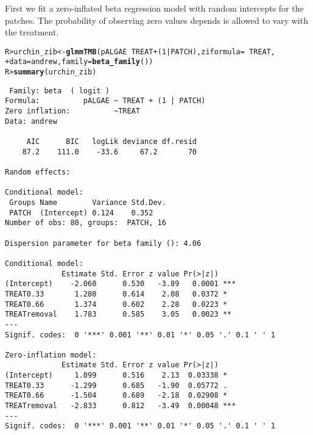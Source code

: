 \documentclass[11pt]{article}\usepackage[]{graphicx}\usepackage{xcolor}
\makeatletter
\newcommand{\hlnum}[1]{\textcolor[rgb]{0.686,0.059,0.569}{#1}}%
\newcommand{\hlopt}[1]{\textcolor[rgb]{0,0,0}{#1}}%
\newcommand{\hlstd}[1]{\textcolor[rgb]{0.345,0.345,0.345}{#1}}%
\newcommand{\hlkwb}[1]{\textcolor[rgb]{0.69,0.353,0.396}{#1}}%
\newcommand{\hlkwc}[1]{\textcolor[rgb]{0.333,0.667,0.333}{#1}}%
\newcommand{\hlkwd}[1]{\textcolor[rgb]{0.737,0.353,0.396}{\textbf{#1}}}%
\newenvironment{kframe}{%
 \def\at@end@of@kframe{}%
 \ifinner\ifhmode%
  \def\at@end@of@kframe{\end{minipage}}%
  \begin{minipage}{\columnwidth}%
 \fi\fi%
 \def\FrameCommand##1{\hskip\@totalleftmargin \hskip-\fboxsep
 \colorbox{shadecolor}{##1}\hskip-\fboxsep
     \hskip-\linewidth \hskip-\@totalleftmargin \hskip\columnwidth}%
 \MakeFramed {\advance\hsize-\width
   \@totalleftmargin\z@ \linewidth\hsize
   \@setminipage}}%
 {\par\unskip\endMakeFramed%
 \at@end@of@kframe}
\newenvironment{knitrout}{}{} %
\newcommand{\0}{{\mathbf{0}}}
\makeatother
\begin{document}
First we fit a zero-inflated beta regression model with random intercepts
for the patches. The probability of observing zero values depends is allowed to
vary with the treatment.
%
\begin{knitrout}\small
{}\color{fgcolor}\begin{kframe}
\begin{alltt}
\hlstd{R> }\hlstd{urchin_zib} \hlkwb{<-} \hlkwd{glmmTMB}\hlstd{(pALGAE} \hlopt{~} \hlstd{TREAT} \hlopt{+} \hlstd{(}\hlnum{1} \hlopt{|} \hlstd{PATCH),} \hlkwc{ziformula} \hlstd{=} \hlopt{~} \hlstd{TREAT,}
\hlstd{+  }                      \hlkwc{data} \hlstd{= andrew,} \hlkwc{family} \hlstd{=} \hlkwd{beta_family}\hlstd{())}
\hlstd{R> }\hlkwd{summary}\hlstd{(urchin_zib)}
\end{alltt}
\begin{verbatim}
 Family: beta  ( logit )
Formula:          pALGAE ~ TREAT + (1 | PATCH)
Zero inflation:          ~TREAT
Data: andrew

     AIC      BIC   logLik deviance df.resid 
    87.2    111.0    -33.6     67.2       70 

Random effects:

Conditional model:
 Groups Name        Variance Std.Dev.
 PATCH  (Intercept) 0.124    0.352   
Number of obs: 80, groups:  PATCH, 16

Dispersion parameter for beta family (): 4.06 

Conditional model:
             Estimate Std. Error z value Pr(>|z|)    
(Intercept)    -2.060      0.530   -3.89   0.0001 ***
TREAT0.33       1.280      0.614    2.08   0.0372 *  
TREAT0.66       1.374      0.602    2.28   0.0223 *  
TREATremoval    1.783      0.585    3.05   0.0023 ** 
---
Signif. codes:  0 '***' 0.001 '**' 0.01 '*' 0.05 '.' 0.1 ' ' 1

Zero-inflation model:
             Estimate Std. Error z value Pr(>|z|)    
(Intercept)     1.099      0.516    2.13  0.03338 *  
TREAT0.33      -1.299      0.685   -1.90  0.05772 .  
TREAT0.66      -1.504      0.689   -2.18  0.02908 *  
TREATremoval   -2.833      0.812   -3.49  0.00048 ***
---
Signif. codes:  0 '***' 0.001 '**' 0.01 '*' 0.05 '.' 0.1 ' ' 1
\end{verbatim}
\end{kframe}
\end{knitrout}
\end{document}
